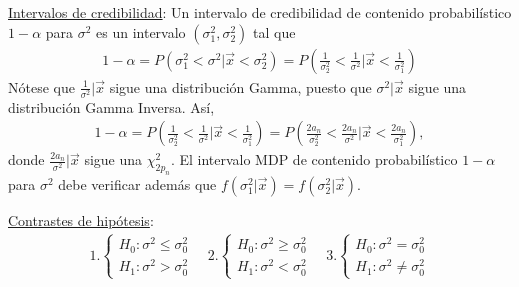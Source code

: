 \underline{Intervalos de credibilidad}: Un intervalo de credibilidad de contenido probabilístico $1-\alpha$ para $\sigma^2$ es un intervalo $(\sigma_1^2, \sigma_2^2)$ tal que
\begin{align*}
    1 - \alpha = P(\sigma_1^2 < \sigma^2 | \vec{x} < \sigma_2^2) = P\left( \frac{1}{\sigma_2^2} < \frac{1}{\sigma^2} |  \vec{x} < \frac{1}{\sigma_1^2} \right)
\end{align*}
Nótese que $\frac{1}{\sigma^2} | \vec{x}$ sigue una distribución Gamma, puesto que $\sigma^2 | \vec{x}$ sigue una distribución Gamma Inversa. Así,
\begin{align*}
    1 - \alpha = P\left( \frac{1}{\sigma_2^2} < \frac{1}{\sigma^2} |  \vec{x} < \frac{1}{\sigma_1^2} \right) = P\left( \frac{2a_n}{\sigma_2^2} < \frac{2a_n}{\sigma^2} |  \vec{x} < \frac{2a_n}{\sigma_1^2} \right),
\end{align*}
donde $\frac{2a_n}{\sigma^2} | \vec{x}$ sigue una $\chi^2_{2p_n}$. El intervalo MDP de contenido probabilístico $1-\alpha$ para $\sigma^2$ debe verificar además que $f(\sigma_1^2 | \vec{x}) = f(\sigma_2^2 | \vec{x})$.

\underline{Contrastes de hipótesis}:
\begin{align*}
    1. \begin{cases}
           H_0 : \sigma^2 \leq \sigma^2_0 \\
           H_1 : \sigma^2 > \sigma^2_0
       \end{cases} \quad     2.\begin{cases}
                                   H_0 : \sigma^2 \ge \sigma^2_0 \\
                                   H_1 : \sigma^2< \sigma^2_0
                               \end{cases} \quad     3.\begin{cases}
                                                           H_0 : \sigma^2 = \sigma^2_0 \\
                                                           H_1 : \sigma^2\not = \sigma^2_0
                                                       \end{cases}
\end{align*}

